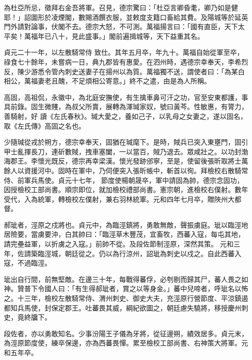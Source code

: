 \begin{pinyinscope}
 為杜亞所忌，徵拜右金吾將軍。召見，德宗驚曰：「杜亞言卿昏耄，卿乃如是健耶！」詔圖形於凌煙閣，數賜酒饌衣服，並敕度支籍口畜給其費。及陽城等於延英門外請對論事，伏閣不去。德宗大怒，不可測。萬福揚言曰：「國有直臣，天下太平矣！萬福年已八十，見此盛事。」閣前遍揖城等，天下益重其名。



 貞元二十一年，以左散騎常侍
 致仕。其年五月卒，年九十。萬福自始從軍至卒，祿食七十餘年，未嘗病一日，典九郡皆有惠愛。在泗州時，遇德宗幸奉天，李希烈反，陳少游悉令管內刺史送妻子在揚州以為質。萬福獨不送，謂使者曰：「為某白相公，萬福妻老且醜，不足煩相公寄意。」終不之遣，由是為人所稱。



 高固，高祖侃，永徽中，為北庭安撫使，有生擒車鼻可汗之功，官至安東都護，事具前錄。固生微賤，為叔父所賣，展轉為渾瑊家奴，號曰黃芩。性敏惠，有膂力，善騎射，好
 讀《左氏春秋》。瑊大愛之，養如己子，以乳母之女妻之，遂以固名，取《左氏傳》高固之名也。



 少隨瑊從戎於朔方，德宗幸奉天，固猶在瑊麾下。是時，賊兵已突入東壅門，固引甲士亂揮長刀，連斫數賊，拽車塞闔，一以當百，賊乃退去。眾咸壯之。以功封渤海郡王。李懷光既反，德宗再幸梁漢。懷光發跡邠寧，至是，使留後張昕取將士萬餘人以資援河中。固時在軍中，乃伺便突入張昕帳中，斬首以徇。拜檢校右散騎常侍、前軍兵馬使。貞元十七年，
 節度使楊朝晟卒，軍中請固為帥，德宗念固功，因授檢校工部尚書。順宗即位，就加檢校禮部尚書。憲宗朝，進檢校右僕射。數年受代，入為統軍，轉檢校左僕射，兼右羽林統軍。元和四年七月卒，贈陜州大都督。



 郝玼者，涇原之戍將也。貞元中，為臨涇鎮將，勇敢無敵，聲振虜庭。玼以臨涇地居險要，當虜要沖，白其帥曰：「臨涇草木豐茂，宜畜牧，西蕃入寇，每屯其地，請完壘益軍，以折虜之入寇。」前帥不從。及段佐節制涇原，深然其策。
 元和三年，佐請築臨涇城，朝廷從之。仍以為行涼州，詔玼為刺史以戍之。自此西蕃入寇，不過臨涇。



 玼出自行間，前無堅敵。在邊三十年，每戰得蕃俘，必刳剔而歸其尸，蕃人畏之如神。贊普下令國人曰：「有生得郝玼者，賞之以等身金。」蕃中兒啼者，呼玼名以怖之。十三年，檢校左散騎常侍、渭州刺史、御史大夫，充涇原行營節度、平涼鎮遏都知兵馬使，封保定郡王。吐蕃畏其威，綱紀欲圖之，朝廷慮失驍將，移授慶州刺史，竟終牖下。



 段佐者，亦以勇敢知名。少事汾陽王子儀為牙將，從征邊朔，績效居多。貞元末，為涇原節度使，練卒保邊，亦為西蕃畏憚。累至檢校工部尚書、右神策大將軍。元和五年卒。




\end{pinyinscope}
